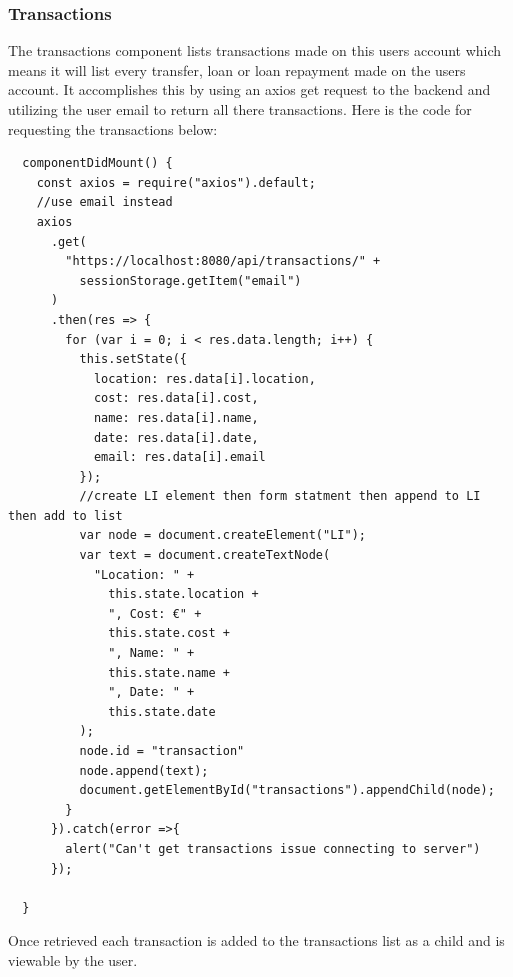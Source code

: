 \subsubsection{Transactions}
The transactions component lists transactions made on this users account which means it
will list every transfer, loan or loan repayment made on the users account.  It accomplishes
this by using an axios get request to the backend and utilizing the user email to return all
there transactions.  Here is the code for requesting the transactions below:
\begin{verbatim}
  componentDidMount() {
    const axios = require("axios").default;
    //use email instead
    axios
      .get(
        "https://localhost:8080/api/transactions/" +
          sessionStorage.getItem("email")
      )
      .then(res => {
        for (var i = 0; i < res.data.length; i++) {
          this.setState({
            location: res.data[i].location,
            cost: res.data[i].cost,
            name: res.data[i].name,
            date: res.data[i].date,
            email: res.data[i].email
          });
          //create LI element then form statment then append to LI then add to list
          var node = document.createElement("LI");
          var text = document.createTextNode(
            "Location: " +
              this.state.location +
              ", Cost: €" +
              this.state.cost +
              ", Name: " +
              this.state.name +
              ", Date: " +
              this.state.date
          );
          node.id = "transaction"
          node.append(text);
          document.getElementById("transactions").appendChild(node);
        }
      }).catch(error =>{
        alert("Can't get transactions issue connecting to server")
      });

  }
\end{verbatim}
Once retrieved each transaction is added to the transactions list as a child and is viewable by the user.
